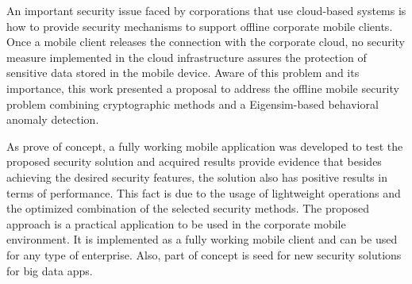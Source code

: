 An important security issue faced by corporations that use cloud-based systems is how to provide security mechanisms to support offline corporate mobile clients. Once a mobile client releases the connection with the corporate cloud, no security measure implemented in the cloud infrastructure assures the protection of sensitive data stored in the mobile device. Aware of this problem and its importance, this work presented a proposal to address the offline mobile security problem combining cryptographic methods and a Eigensim-based behavioral anomaly detection. 

As prove of concept, a fully working mobile application was developed to test the proposed security solution and acquired results provide evidence that besides achieving the desired security features, the solution also has positive results in terms of performance. This fact is due to the usage of lightweight operations and the optimized combination of the selected security methods. The proposed approach is a practical application to be used in the corporate mobile environment. It is implemented as a fully working mobile client and can be used for any type of enterprise. Also, part of concept is seed for new security solutions for big data apps. 
